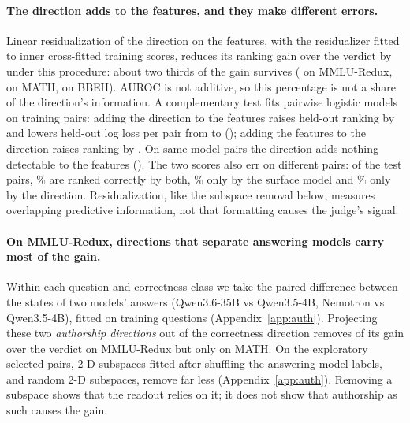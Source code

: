 \documentclass[11pt]{article}
\begin{document}
\paragraph{The direction adds to the features, and they make different errors.} Linear residualization of the direction on the features, with the residualizer fitted to inner cross-fitted training scores, reduces its ranking gain over the verdict by  under this procedure: about two thirds of the gain survives ( on MMLU-Redux,  on MATH,  on BBEH). AUROC is not additive, so this percentage is not a share of the direction's information. A complementary test fits pairwise logistic models on training pairs: adding the direction to the features raises held-out ranking by  and lowers held-out log loss per pair from  to  (); adding the features to the direction raises ranking by . On same-model pairs the direction adds nothing detectable to the features (). The two scores also err on different pairs: of the test pairs, \% are ranked correctly by both, \% only by the surface model and \% only by the direction. Residualization, like the subspace removal below, measures overlapping predictive information, not that formatting causes the judge's signal.

\paragraph{On MMLU-Redux, directions that separate answering models carry most of the gain.} Within each question and correctness class we take the paired difference between the states of two models' answers (Qwen3.6-35B vs Qwen3.5-4B, Nemotron vs Qwen3.5-4B), fitted on training questions (Appendix~\ref{app:auth}). Projecting these two \emph{authorship directions} out of the correctness direction removes  of its gain over the verdict on MMLU-Redux but only  on MATH. On the exploratory selected pairs, 2-D subspaces fitted after shuffling the answering-model labels, and random 2-D subspaces, remove far less (Appendix~\ref{app:auth}). Removing a subspace shows that the readout relies on it; it does not show that authorship as such causes the gain.
\end{document}
